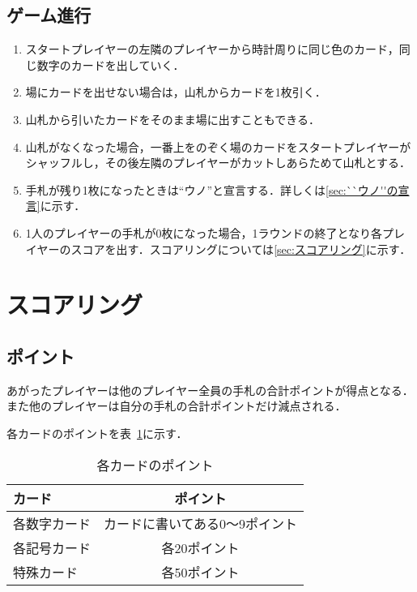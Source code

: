 \documentclass[11pt]{ltjsarticle}
\newcommand{\tabref}[1]{表~\ref{#1}}
\begin{document}
\subsection{ゲーム進行}
\begin{enumerate}
  \item スタートプレイヤーの左隣のプレイヤーから時計周りに同じ色のカード，同じ数字のカードを出していく．
  \item 場にカードを出せない場合は，山札からカードを1枚引く．
  \item 山札から引いたカードをそのまま場に出すこともできる．
  \item 山札がなくなった場合，一番上をのぞく場のカードをスタートプレイヤーがシャッフルし，その後左隣のプレイヤーがカットしあらためて山札とする．
  \item 手札が残り1枚になったときは``ウノ''と宣言する．詳しくは\ref{sec:``ウノ''の宣言}に示す．
  \item 1人のプレイヤーの手札が0枚になった場合，1ラウンドの終了となり各プレイヤーのスコアを出す．スコアリングについては\ref{sec:スコアリング}に示す．
\end{enumerate}

\newpage

\section{スコアリング}
\label{seac:スコアリング}

\subsection{ポイント}

あがったプレイヤーは他のプレイヤー全員の手札の合計ポイントが得点となる．
また他のプレイヤーは自分の手札の合計ポイントだけ減点される．

各カードのポイントを\tabref{tab:カードポイント}に示す．

\begin{table}[h]
  \begin{center}
    \caption{各カードのポイント}
    \begin{tabular}{|l|c|} \hline
      カード & ポイント \\ \hline \hline
      各数字カード & カードに書いてある0～9ポイント \\
      各記号カード & 各20ポイント \\
      特殊カード & 各50ポイント \\ \hline
    \end{tabular}
    \label{tab:カードポイント}
  \end{center}
\end{table}
\end{document}
